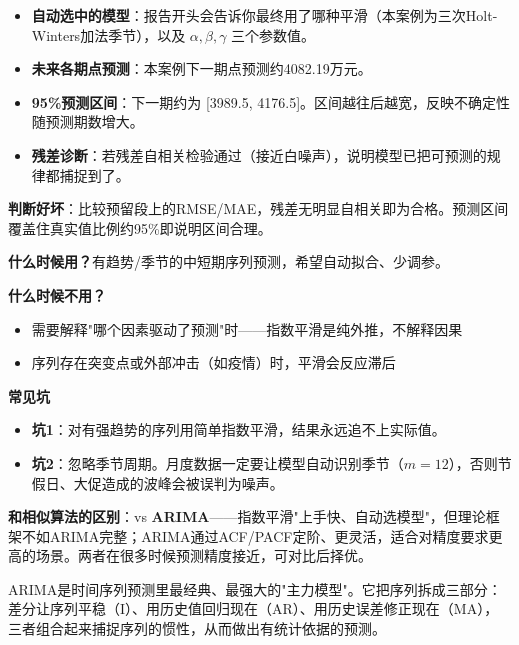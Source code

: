 \begin{algoresult}
\begin{itemize}
    \item \textbf{自动选中的模型}：报告开头会告诉你最终用了哪种平滑（本案例为三次Holt-Winters加法季节），以及 $\alpha,\beta,\gamma$ 三个参数值。
    \item \textbf{未来各期点预测}：本案例下一期点预测约4082.19万元。
    \item \textbf{95\%预测区间}：下一期约为 [3989.5, 4176.5]。区间越往后越宽，反映不确定性随预测期数增大。
    \item \textbf{残差诊断}：若残差自相关检验通过（接近白噪声），说明模型已把可预测的规律都捕捉到了。
\end{itemize}

\textbf{判断好坏}：比较预留段上的RMSE/MAE，残差无明显自相关即为合格。预测区间覆盖住真实值比例约95\%即说明区间合理。
\end{algoresult}

\begin{algonotes}
\textbf{什么时候用？}有趋势/季节的中短期序列预测，希望自动拟合、少调参。

\textbf{什么时候不用？}
\begin{itemize}
    \item 需要解释"哪个因素驱动了预测"时——指数平滑是纯外推，不解释因果
    \item 序列存在突变点或外部冲击（如疫情）时，平滑会反应滞后
\end{itemize}

\textbf{常见坑}
\begin{itemize}
    \item \textbf{坑1}：对有强趋势的序列用简单指数平滑，结果永远追不上实际值。
    \item \textbf{坑2}：忽略季节周期。月度数据一定要让模型自动识别季节（$m=12$），否则节假日、大促造成的波峰会被误判为噪声。
\end{itemize}

\textbf{和相似算法的区别}：vs \textbf{ARIMA}——指数平滑"上手快、自动选模型"，但理论框架不如ARIMA完整；ARIMA通过ACF/PACF定阶、更灵活，适合对精度要求更高的场景。两者在很多时候预测精度接近，可对比后择优。
\end{algonotes}


\begin{algointro}
ARIMA是时间序列预测里最经典、最强大的"主力模型"。它把序列拆成三部分：差分让序列平稳（I）、用历史值回归现在（AR）、用历史误差修正现在（MA），三者组合起来捕捉序列的惯性，从而做出有统计依据的预测。
\end{algointro}

